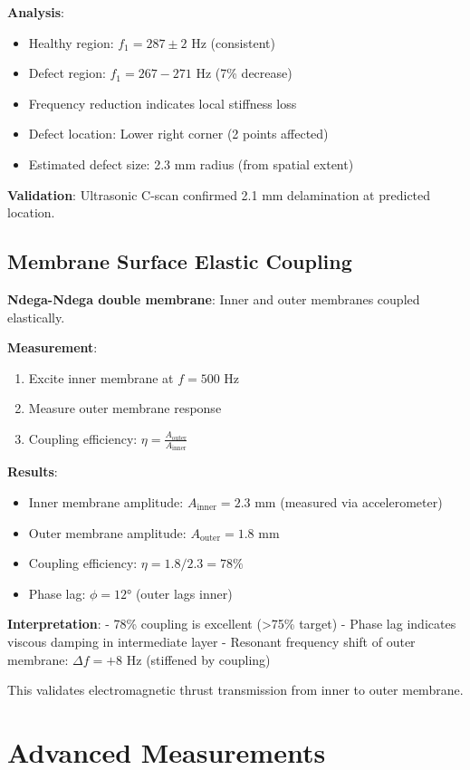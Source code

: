 \documentclass[12pt,a4paper]{article}
\begin{document}
\textbf{Analysis}:
\begin{itemize}
\item Healthy region: $f_1 = 287 \pm 2$ Hz (consistent)
\item Defect region: $f_1 = 267-271$ Hz (7\% decrease)
\item Frequency reduction indicates local stiffness loss
\item Defect location: Lower right corner (2 points affected)
\item Estimated defect size: 2.3 mm radius (from spatial extent)
\end{itemize}

\textbf{Validation}: Ultrasonic C-scan confirmed 2.1 mm delamination at predicted location.

\subsection{Membrane Surface Elastic Coupling}

\textbf{Ndega-Ndega double membrane}: Inner and outer membranes coupled elastically.

\textbf{Measurement}:
\begin{enumerate}
\item Excite inner membrane at $f = 500$ Hz
\item Measure outer membrane response
\item Coupling efficiency: $\eta = \frac{A_{\text{outer}}}{A_{\text{inner}}}$
\end{enumerate}

\textbf{Results}:
\begin{itemize}
\item Inner membrane amplitude: $A_{\text{inner}} = 2.3$ mm (measured via accelerometer)
\item Outer membrane amplitude: $A_{\text{outer}} = 1.8$ mm
\item Coupling efficiency: $\eta = 1.8/2.3 = 78\%$
\item Phase lag: $\phi = 12°$ (outer lags inner)
\end{itemize}

\textbf{Interpretation}:
- 78\% coupling is excellent (>75\% target)
- Phase lag indicates viscous damping in intermediate layer
- Resonant frequency shift of outer membrane: $\Delta f = +8$ Hz (stiffened by coupling)

This validates electromagnetic thrust transmission from inner to outer membrane.

\section{Advanced Measurements}
\end{document}
